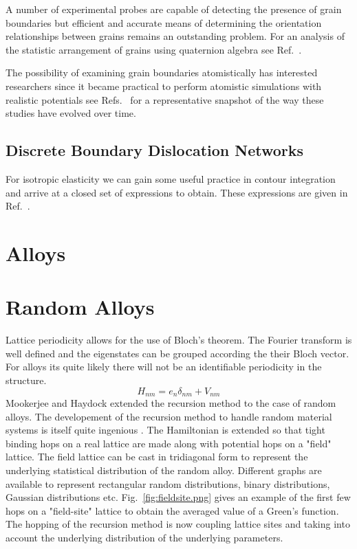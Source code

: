 A number of experimental probes are capable of detecting the presence of 
grain boundaries but efficient and accurate means of determining 
the orientation relationships between grains remains an outstanding problem.
For an analysis of the statistic arrangement of grains using quaternion
algebra see Ref.~\cite{sutton96}.

The possibility of examining grain boundaries atomistically has interested
researchers since it became practical to perform atomistic simulations
with realistic potentials see Refs.~\cite{bristowe75,wolf83,paxton87,paxton88,paxtonsutton88,
kohyama88,kohyama94,paxton96,rittner96,tschopp07,momida13,du11,du12,mceniry18} for a representative
snapshot of the way these studies have evolved over time.


\subsection{Discrete Boundary Dislocation Networks}
For isotropic elasticity we can gain some useful practice in contour integration and arrive
at a closed set of expressions to obtain. These expressions are given in Ref.~\cite{sutton95}.

\section{Alloys}
\cite{glaser81}
\section{Random Alloys}
Lattice periodicity allows for the use of Bloch's theorem. The Fourier transform
is well defined and the eigenstates can be grouped according the their Bloch vector.
For alloys its quite likely there will not be an identifiable periodicity in 
the structure.
%
\begin{equation}
H_{nm} = e_{n}\delta_{nm} + V_{nm}
\end{equation}
%
Mookerjee and Haydock extended the recursion method to the case of random alloys.
The developement of the recursion method to handle random material systems is 
itself quite ingenious \cite{mookerjee, haydock74}. The Hamiltonian is extended
so that tight binding hops on a real lattice are made along with potential hops
on a "field" lattice. The field lattice can be cast in tridiagonal form to represent
the underlying statistical distribution of the random alloy. Different graphs are available
to represent rectangular random distributions, binary distributions, Gaussian distributions
etc. Fig.~\ref{fig:fieldsite.png} gives an example of the first few hops on a "field-site" 
lattice to obtain the averaged value of a Green's function. The hopping of the recursion method
is now coupling lattice sites and taking into account the underlying distribution of 
the underlying parameters.

